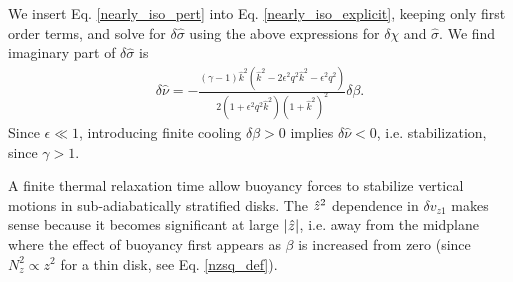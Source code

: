 We insert Eq. \ref{nearly_iso_pert} into
Eq. \ref{nearly_iso_explicit}, keeping only first order terms, and
solve for $\delta\hat{\sigma}$ using the above expressions for $\delta\chi$
and $\hat{\sigma}$. We find imaginary part of $\delta\hat{\sigma}$
is 
\begin{align}
  \delta\hat{\nu} =
  -\frac{\left(\gamma-1\right)\hat{k}^2 \left(\hat{k}^2 -
      2\epsilon^2q^2\hat{k}^2 - \epsilon^2q^2\right)}{2\left(1+\epsilon^2 q^2
      \hat{k}^2\right)\left(1+\hat{k}^2\right)^2}\delta\beta.  
\end{align}
Since $\epsilon \ll 1$, introducing finite cooling $\delta\beta>0$
implies $\delta\hat{\nu} < 0$, i.e. stabilization, since $\gamma>1$. 

A finite thermal relaxation time allow buoyancy
forces to stabilize vertical motions in sub-adiabatically stratified
disks. The $\hat{z}^2$ dependence in $\delta v_{z1}$ makes  
sense because it becomes significant at large $|\hat{z}|$, i.e. away from
the midplane where the effect of buoyancy first appears as $\beta$ is
increased from zero (since $N_z^2\propto z^2$ for a thin disk, see
Eq. \ref{nzsq_def}).   

